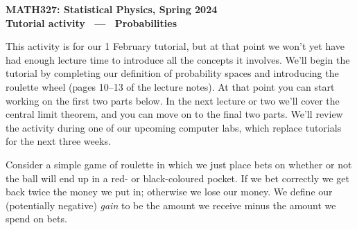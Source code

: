 \documentclass[12 pt]{article} %
\begin{document}
\newcommand{\thisunit}{MATH327 Tutorial (Probabilities)}
\newcommand{\moddate}{Last modified 1 Feb.~2024}
\begin{center}
  {\Large \textbf{MATH327: Statistical Physics, Spring 2024}} \\[12 pt]
  {\Large \textbf{Tutorial activity \ --- \ Probabilities}} \\[24 pt]
\end{center}

This activity is for our 1 February tutorial, but at that point we won't yet have had enough lecture time to introduce all the concepts it involves.
We'll begin the tutorial by completing our definition of probability spaces and introducing the roulette wheel (pages 10--13 of the lecture notes).
At that point you can start working on the first two parts below.
In the next lecture or two we'll cover the central limit theorem, and you can move on to the final two parts.
We'll review the activity during one of our upcoming computer labs, which replace tutorials for the next three weeks.

Consider a simple game of roulette in which we just place bets on whether or not the ball will end up in a red- or black-coloured pocket. %
If we bet correctly we get back twice the money we put in; otherwise we lose our money.
We define our (potentially negative) \textit{gain} to be the amount we receive minus the amount we spend on bets.
\end{document}

